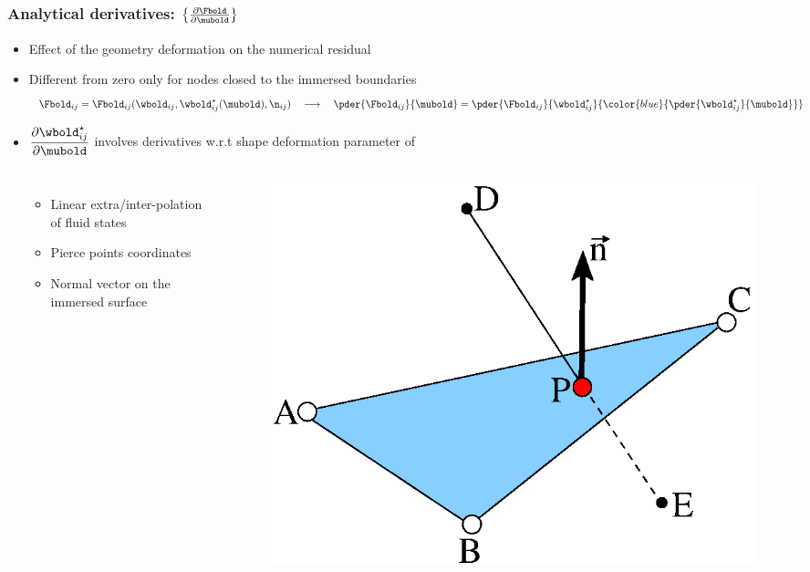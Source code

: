 \begin{frame}
  \frametitle{Analytical derivatives: $\left\{\frac{\partial \Fbold}{\partial \mubold}\right\}$}
  \begin{itemize}
  \item Effect of the geometry deformation on the numerical residual \\[1.5mm]
  \item Different from zero only for nodes closed to the immersed boundaries
    \begin{equation*}
      \Fbold_{ij} = \Fbold_{ij}(\wbold_{ij}, \wbold^\star_{ij}(\mubold), \n_{ij})
      \quad\longrightarrow\quad
      \pder{\Fbold_{ij}}{\mubold} = 
      \pder{\Fbold_{ij}}{\wbold^\star_{ij}}{\color{blue}{\pder{\wbold^\star_{ij}}{\mubold}}}
    \end{equation*} \vspace{-2.5mm}
    \item $\dfrac{\partial \wbold^\star_{ij}}{\partial \mubold}$ 
      involves derivatives w.r.t shape deformation parameter of\vspace{-4mm}
      \begin{columns}[t]
        \vspace{5mm}
        \begin{itemize}
        \item Linear extra/inter-polation of fluid states\\[-2mm]
        \item Pierce points coordinates\\[-2mm]
        \item Normal vector on the immersed surface\\[-2mm]
        \end{itemize}
        \begin{figure}[!ht]
          \centering
          \includegraphics[width=0.65\linewidth]{Fig/pierce}

\end{figure}
\end{columns}
\end{itemize}
\end{frame}

